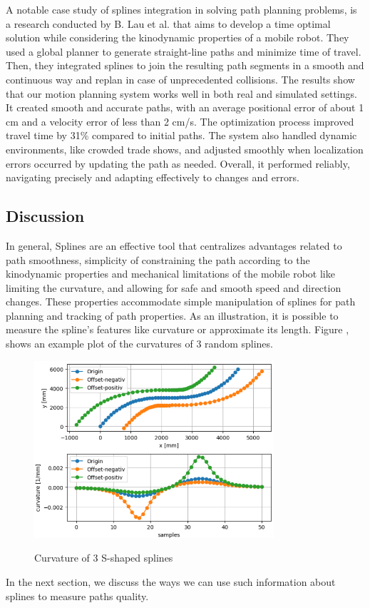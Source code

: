 A notable case study of splines integration in solving path planning problems, is a research conducted 
by B. Lau et al. \cite{R30} that aims to develop a time optimal solution while considering the kinodynamic 
properties of a mobile robot. They used a global planner to generate straight-line paths and minimize time 
of travel. Then, they  integrated splines to join the resulting path segments in a smooth and continuous 
way and replan in case of unprecedented collisions. The results show that our motion planning system works 
well in both real and simulated settings. It created smooth and accurate paths, with an average positional 
error of about 1 cm and a velocity error of less than 2 cm/s. The optimization process improved travel 
time by 31\% compared to initial paths. The system also handled dynamic environments, like crowded trade 
shows, and adjusted smoothly when localization errors occurred by updating the path as needed. Overall, 
it performed reliably, navigating precisely and adapting effectively to changes and errors.

\subsection{Discussion}
In general, Splines are an effective tool that centralizes advantages related to path smoothness, 
simplicity of constraining the path according to the kinodynamic properties and mechanical limitations of the 
mobile robot like limiting the curvature, and allowing for safe and smooth speed and direction changes. 
These properties accommodate simple manipulation of splines for path planning and tracking of path properties.
As an illustration, it is possible to measure the spline's features like curvature or approximate its length.
Figure , shows an example plot of the curvatures of 3 random splines.

\begin{figure}[H]
    \begin{center}
        \includegraphics[width=3.5in]{images/Chap1/curvature.png}\\
        \caption{Curvature of 3 S-shaped splines}
        \label{curvature}
    \end{center}
\end{figure}
In the next section, we discuss the ways we can use such information about splines to measure paths quality.

